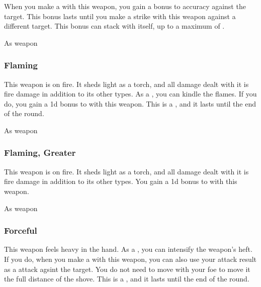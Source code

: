 When you make a  with this weapon, you gain a  bonus to accuracy against the target.
This bonus lasts until you make a strike with this weapon against a different target.
This bonus can stack with itself, up to a maximum of .



 


 As weapon


\lowercase{\hypertarget{item:Flaming}{}}\label{item:Flaming}
\hypertarget{item:Flaming}{\subsubsection{Flaming\hfill{}}}

This weapon is on fire.
It sheds light as a torch, and all damage dealt with it is fire damage in addition to its other types.
As a , you can kindle the flames.
If you do, you gain a \plus1d bonus to  with this weapon.
This is a , and it lasts until the end of the round.



 


 As weapon


\lowercase{\hypertarget{item:Flaming, Greater}{}}\label{item:Flaming, Greater}
\hypertarget{item:Flaming, Greater}{\subsubsection{Flaming, Greater\hfill{}}}

This weapon is on fire.
It sheds light as a torch, and all damage dealt with it is fire damage in addition to its other types.
You gain a \plus1d bonus to  with this weapon.



 


 As weapon


\lowercase{\hypertarget{item:Forceful}{}}\label{item:Forceful}
\hypertarget{item:Forceful}{\subsubsection{Forceful\hfill{}}}

This weapon feels heavy in the hand.
As a , you can intensify the weapon's heft.
If you do, when you make a  with this weapon, you can also use your attack result as a  attack agsint the target.
You do not need to move with your foe to move it the full distance of the shove.
This is a , and it lasts until the end of the round.



